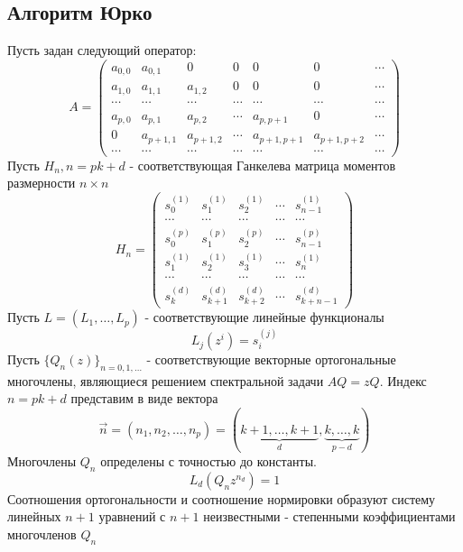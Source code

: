 \subsection{Алгоритм Юрко} Пусть задан следующий оператор:
$$%
A = \left(\begin{array}{ccccccc}
a_{0,0}&a_{0,1}&0&0&0&0&\cdots\\
a_{1,0}&a_{1,1}&a_{1,2}&0&0&0&\cdots\\
\cdots&\cdots&\cdots&\cdots&\cdots&\cdots&\cdots\\
a_{p,0}&a_{p,1}&a_{p,2}&\cdots&a_{p,p+1}&0&\cdots\\
0&a_{p+1,1}&a_{p+1,2}&\cdots&a_{p+1,p+1}&a_{p+1,p+2}&\cdots\\
\cdots&\cdots&\cdots&\cdots&\cdots&\cdots&\cdots
\end{array}\right)
$$%
Пусть $H_n, n=pk+d$ - соответствующая Ганкелева
матрица моментов размерности $n \times n$
$$%
H_n = \left(
\begin{array}{ccccccccccccc}
s_0^{(1)} & s_1^{(1)} & s_2^{(1)}  & \cdots &  s_{n-1}^{(1)}\\
\cdots    & \cdots    & \cdots      & \cdots    & \cdots    \\
s_0^{(p)} & s_1^{(p)} & s_2^{(p)}  & \cdots &  s_{n-1}^{(p)}\\
s_1^{(1)} & s_2^{(1)} & s_3^{(1)} & \cdots &  s_{n}^{(1)}\\
\cdots    & \cdots    & \cdots      & \cdots    & \cdots   \\
s_k^{(d)} & s_{k+1}^{(d)} & s_{k+2}^{(d)}  & \cdots  &
s_{k+n-1}^{(d)}
\end{array}
\right)
$$%
Пусть $L=(L_1,\ldots,L_p)$ -
соответствующие линейные функционалы
$$L_j(z^i)=s_i^{(j)}$$
Пусть $\{Q_n(z)\}_{n=0,1,\ldots}$ - соответствующие векторные
ортогональные многочлены, являющиеся решением спектральной задачи
$AQ=zQ$. Индекс $n=pk+d$ представим в виде вектора
$$\overrightarrow{n}=(n_1,n_2,\ldots,n_p)=(\underbrace{k+1,\ldots,k+1}_{d},\underbrace{k,\ldots,k}_{p-d})$$
Многочлены $Q_n$ определены с точностью до константы.
$$L_d(Q_nz^{n_d})=1$$
Соотношения ортогональности и соотношение нормировки образуют
систему линейных $n+1$ уравнений с $n+1$ неизвестными -
степенными коэффициентами многочленов $Q_n$
